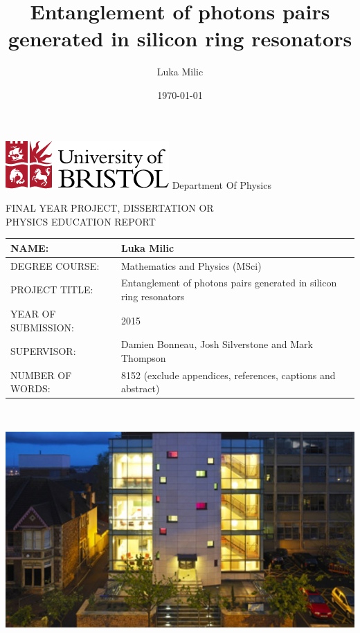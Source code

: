 \documentclass[11pt]{article}
\title{Entanglement of photons pairs generated in silicon ring resonators}
\date{\today}
\author{Luka Milic}
\numberwithin{equation}{section}
\numberwithin{figure}{section}
\begin{document}
\begin{titlepage}
  \includegraphics[scale=0.6]{img/uob-logo.png}\hfill
  \LARGE Department Of Physics \\
  \begin{center}
    FINAL YEAR PROJECT, DISSERTATION OR\\
    PHYSICS EDUCATION REPORT
  \end{center} 

  \large
  {\renewcommand{\arraystretch}{2}%
  \begin{tabular}[t]{|l|p{10cm}|}
    \hline
    NAME: & Luka Milic \\ \hline
    DEGREE COURSE: & Mathematics and Physics (MSci)\\ \hline
    PROJECT TITLE: & Entanglement of photons pairs generated in silicon ring resonators \\ \hline
    YEAR OF SUBMISSION: & 2015\\ \hline
    SUPERVISOR: & Damien Bonneau, Josh Silverstone and Mark Thompson\\ \hline
    NUMBER OF WORDS: & 8152 (exclude appendices, references, captions and abstract)\\ \hline
  \end{tabular} } \quad
  \\[1.5cm]
  \begin{center}
    \includegraphics[scale=0.7]{img/nsqi.jpg}
  \end{center}
\end{titlepage}
\newpage
\maketitle
\end{document}
